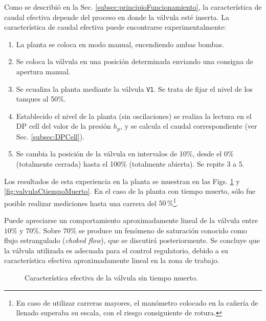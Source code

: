 Como se describió en la Sec. \ref{subsec:principioFuncionamiento}, la
característica de caudal efectiva depende del proceso en donde la válvula esté
inserta. La característica de caudal efectiva puede encontrarse
experimentalmente:
\begin{enumerate}
 \item La planta se coloca en modo manual, encendiendo ambas bombas.
 \item Se coloca la válvula en una posición determinada enviando una consigna
de apertura manual.
 \item Se ecualiza la planta mediante la válvula \verb|V1|. Se trata de fijar
el nivel de los tanques al 50\%.
 \item Establecido el nivel de la planta (sin oscilaciones) se realiza la
lectura en el DP cell del valor de la presión $h_p$,
y se calcula el caudal correspondiente (ver Sec. \ref{subsec:DPCell}).
 \item Se cambia la posición de la válvula en intervalos de
 10\%, desde el 0\% (totalmente cerrada) hasta el 100\% (totalmente abierta).
Se repite 3 a 5.
\end{enumerate}

Los resultados de esta experiencia en la planta se muestran en las Figs.
\ref{fig:valvulaStiempoMuerto} y \ref{fig:valvulaCtiempoMuerto}.
En el caso de la planta con tiempo muerto, sólo fue posible realizar mediciones
hasta una carrera del $50\,\%$\footnote{En caso de utilizar carreras mayores,
el manómetro colocado en la cañería de llenado superaba su escala, con el
riesgo consiguiente de rotura.}.

Puede apreciarse un comportamiento aproximadamente lineal de la válvula entre
$10\%$ y $70\%$.
Sobre $70\%$  se produce un fenómeno de saturación conocido como flujo
estrangulado (\emph{choked flow}), que se discutirá posteriormente.
Se concluye que la válvula utilizada es adecuada para el
control regulatorio, debido a su característica efectiva aproximadamente lineal
en la zona de trabajo.

\begin{figure}[ht]
  \centering
\caption{Característica efectiva de la válvula sin tiempo muerto.}
\label{fig:valvulaStiempoMuerto}
\end{figure}

